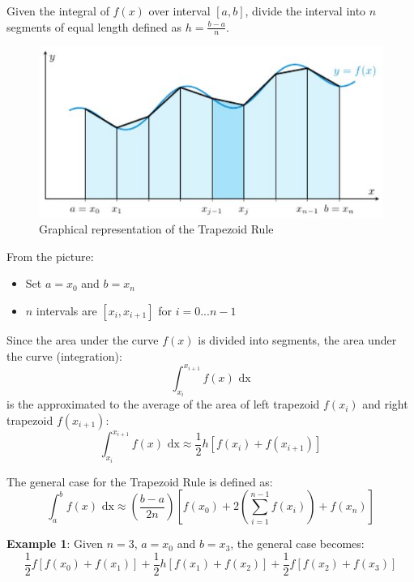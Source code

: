 \documentclass[10pt,a4paper]{article}
\begin{document}
Given the integral of $f(x)$ over interval $[a,b]$, divide the interval into $n$ segments of equal
length defined as $h=\frac{b-a}{n}$.

\begin{figure} [h!]
    \centering
    \includegraphics[scale=0.6]{Trapezoid.JPG}
    \caption{Graphical representation of the Trapezoid Rule}
\end{figure}

From the picture:
\begin{itemize}
    \item Set $a=x_0$ and $b=x_n$
    \item $n$ intervals are $[x_i,x_{i+1}]$ for $i=0...n-1$
\end{itemize}

Since the area under the curve $f(x)$ is divided into segments, the area under the curve
(integration):
$$
\int_{x_i}^{x_{i+1}} f(x) \text{ dx}
$$
is the approximated to the average of the area of left trapezoid $f(x_i)$ and right trapezoid
$f(x_{i+1})$:
$$
\int_{x_i}^{x_{i+1}} f(x) \text{ dx} \approx \frac{1}{2}h[f(x_i)+f(x_{i+1})]
$$

\begin{tcolorbox}[breakable,colback=white,colframe=black,width=\dimexpr\textwidth+12mm\relax,enlarge left by=-6mm]
    The general case for the Trapezoid Rule is defined as:
    $$
    \int_a^b f(x)\text{ dx} \approx \left(\frac{b-a}{2n}\right)\left[f(x_0)+2\left(\sum_{i=1}^{n-1}f(x_i)\right)+f(x_n)\right]
    $$
\end{tcolorbox}

\textbf{Example 1}: Given $n=3$, $a=x_0$ and $b=x_3$, the general case becomes: 
$$
\frac{1}{2}f\left[f(x_0)+f(x_1)\right]+\frac{1}{2}h\left[f(x_1)+f(x_2)\right]+\frac{1}{2}f\left[f(x_2)+f(x_3)\right]
$$

\end{document}
